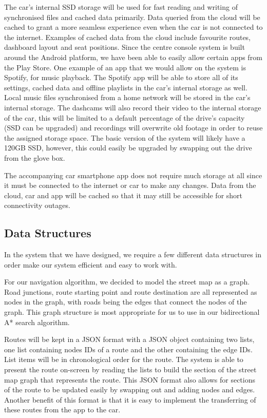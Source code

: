\documentclass{article}
\begin{document}
The car's internal SSD storage will be used for fast reading and writing of synchronised files and cached data primarily. Data queried from the cloud will be cached to grant a more seamless experience even when the car is not connected to the internet. Examples of cached data from the cloud include favourite routes, dashboard layout and seat positions. Since the centre console system is built around the Android platform, we have been able to easily allow certain apps from the Play Store. One example of an app that we would allow on the system is Spotify, for music playback. The Spotify app will be able to store all of its settings, cached data and offline playlists in the car's internal storage as well. Local music files synchronised from a home network will be stored in the car's internal storage. The dashcams will also record their video to the internal storage of the car, this will be limited to a default percentage of the drive's capacity (SSD can be upgraded) and recordings will overwrite old footage in order to reuse the assigned storage space. The basic version of the system will likely have a 120GB SSD, however, this could easily be upgraded by swapping out the drive from the glove box.

The accompanying car smartphone app does not require much storage at all since it must be connected to the internet or car to make any changes. Data from the cloud, car and app will be cached so that it may still be accessible for short connectivity outages.

\subsection{Data Structures}\label{ssec:data-structures} %
In the system that we have designed, we require a few different data structures in order make our system efficient and easy to work with.

For our navigation algorithm, we decided to model the street map as a graph. Road junctions, route starting point and route destination are all represented as nodes in the graph, with roads being the edges that connect the nodes of the graph. This graph structure is most appropriate for us to use in our bidirectional A* search algorithm.

Routes will be kept in a JSON format with a JSON object containing two lists, one list containing nodes IDs of a route and the other containing the edge IDs. List items will be in chronological order for the route. The system is able to present the route on-screen by reading the lists to build the section of the street map graph that represents the route. This JSON format also allows for sections of the route to be updated easily by swapping out and adding nodes and edges. Another benefit of this format is that it is easy to implement the transferring of these routes from the app to the car.
\end{document}
